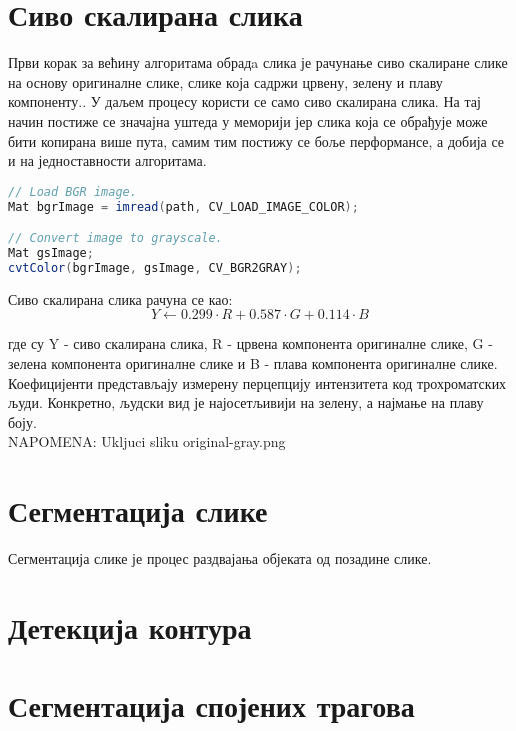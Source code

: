 \documentclass[12pt,a4paper,serbian,oneside]{book}
\begin{document}
\section{Сиво скалирана слика}

Први корак за већину алгоритама обрадa слика је рачунање сиво скалиране слике на основу оригиналне слике, слике која садржи црвену, зелену и плаву компоненту.. У даљем процесу користи се само сиво скалирана слика. На тај начин  постиже се значајна уштеда у меморији јер слика која се обрађује може бити копирана више пута, самим тим постижу се боље перформансе,  а добија се и на једноставности алгоритама.

\begin{lstlisting}[language=Java,label=lst:grayscale,caption=Рачунање сиво скалиране слике]
// Load BGR image.
Mat bgrImage = imread(path, CV_LOAD_IMAGE_COLOR);

// Convert image to grayscale.
Mat gsImage;
cvtColor(bgrImage, gsImage, CV_BGR2GRAY);
\end{lstlisting}

 Сиво скалирана слика рачуна се као:
\begin{equation}
Y \gets 0.299 \cdot R + 0.587 \cdot G + 0.114 \cdot B
\end{equation}

где су Y - сиво скалирана слика, R - црвена компонента оригиналне слике, G - зелена компонента оригиналне слике и B - плава компонента оригиналне слике. Коефицијенти представљају измерену перцепцију интензитета код трохроматских људи. Конкретно, људски вид је најосетљивији на зелену, а најмање на плаву боју. \\

NAPOMENA: Ukljuci sliku original-gray.png

\section{Сегментација слике}

Сегментација слике је процес раздвајања објеката од позадине слике.

\section{Детекција контура}

\section{Сегментација спојених трагова}
\end{document}
